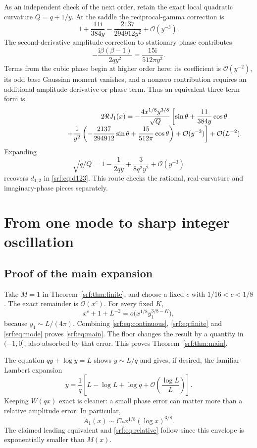 \documentclass[11pt]{article}
\theoremstyle{remark}\newtheorem{remark}[theorem]{Remark}
\newcommand{\OO}{\mathcal O}
\newcommand{\ii}{\mathrm i}
\begin{document}
As an independent check of the next order, retain the exact local quadratic curvature $Q=q+1/y$. At the saddle the reciprocal-gamma correction is
\[
 1+\frac{11\ii}{384y}-\frac{2137}{294912y^2}+\OO(y^{-3}).
\]
The second-derivative amplitude correction to stationary phase contributes
\[
 -\frac{\ii\beta(\beta-1)}{2qy^2}
       =\frac{15\ii}{512\pi y^2}.
\]
Terms from the cubic phase begin at higher order here: its coefficient is $\OO(y^{-2})$, its odd base Gaussian moment vanishes, and a nonzero contribution requires an additional amplitude derivative or phase term. Thus an equivalent three-term form is
\begin{align}
 2\Re J_1(x)=-\frac{4x^{1/8}y^{3/8}}{\sqrt Q}
 \left[\sin\theta+\frac{11}{384y}\cos\theta\right.\qquad\notag\\[-3pt]
 \left.\hspace{26mm}+\frac1{y^2}
 \left(-\frac{2137}{294912}\sin\theta
             +\frac{15}{512\pi}\cos\theta\right)
 +\OO(y^{-3})\right]+\OO(L^{-2}).\label{srf:eq:curvatureform}
\end{align}
Expanding
\[
 \sqrt{q/Q}=1-\frac1{2qy}+\frac3{8q^2y^2}+\OO(y^{-3})
\]
recovers $d_{1,2}$ in \eqref{srf:eq:d123}. This route checks the rational, real-curvature and imaginary-phase pieces separately.

\section{From one mode to sharp integer oscillation}\label{srf:sec:oscillation}
\subsection{Proof of the main expansion}
Take $M=1$ in Theorem~\ref{srf:thm:finite}, and choose a fixed $c$ with $1/16<c<1/8$. The exact remainder is $\OO(x^c)$. For every fixed $K$,
\[
 x^c+1+L^{-2}=o\bigl(x^{1/8}y_1^{3/8-K}\bigr),
\]
because $y_1\sim L/(4\pi)$. Combining \eqref{srf:eq:continuous}, \eqref{srf:eq:finite} and \eqref{srf:eq:mode} proves \eqref{srf:eq:main}. The floor changes the result by a quantity in $(-1,0]$, also absorbed by that error. This proves Theorem~\ref{srf:thm:main}.

The equation $qy+\log y=L$ shows $y\sim L/q$ and gives, if desired, the familiar Lambert expansion
\[
 y=\frac1q\left[L-\log L+\log q
                +\OO\!\left(\frac{\log L}{L}\right)\right].
\]
Keeping $W(qx)$ exact is cleaner: a small phase error can matter more than a relative amplitude error. In particular,
\begin{equation}\label{srf:eq:envelope}
 A_1(x)\sim C_*x^{1/8}(\log x)^{3/8}.
\end{equation}
The claimed leading equivalent and \eqref{srf:eq:relative} follow since this envelope is exponentially smaller than $M(x)$.
\end{document}
